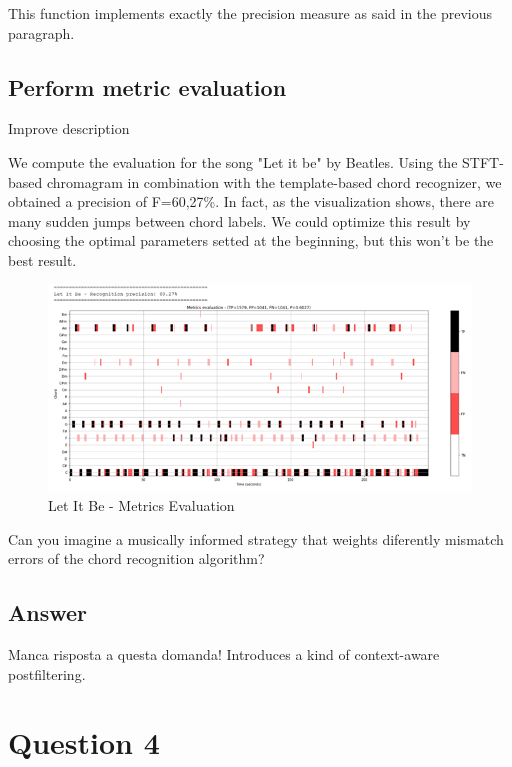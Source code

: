 \documentclass[
	12pt, %
]{fphw}
\begin{document}
This function implements exactly the precision measure as said in the previous paragraph.

\subsection*{Perform metric evaluation}

\color{red}Improve description\color{black}

We compute the evaluation for the song "Let it be" by Beatles.
Using the STFT-based chromagram in combination with the template-based chord recognizer, we obtained a precision of F=60,27\%. In fact, as the visualization shows, there are many sudden jumps between chord labels. We could optimize this result by choosing the optimal parameters setted at the beginning, but this won't be the best result.

\begin{figure}[H]
 \centering
 \includegraphics[scale=1]{./images/3_let_it_be_metrics.png}
 \caption{Let It Be - Metrics Evaluation}
\end{figure}

\begin{problem}
	Can you imagine a musically informed strategy that weights diferently mismatch errors of
the chord recognition algorithm?
\end{problem}

\subsection*{\color{blue}Answer}

\color{red}Manca risposta a questa domanda!\color{black}
Introduces a kind of context-aware postfiltering.


\section*{\color{red}Question 4}
\end{document}
